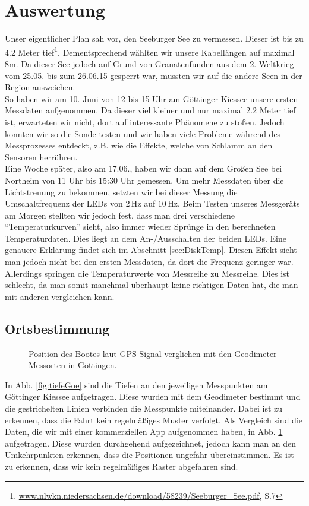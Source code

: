 \documentclass[12pt,a4paper,titlepage,headinclude,bibtotoc]{scrartcl}
\numberwithin{equation}{subsection}
\begin{document}
\section{Auswertung}
\label{sec:auswertung}

Unser eigentlicher Plan sah vor, den Seeburger See zu vermessen.
Dieser ist bis zu 4.2 Meter tief\footnote{\url{www.nlwkn.niedersachsen.de/download/58239/Seeburger\_See.pdf}, S.7}.
Dementsprechend wählten wir unsere Kabellängen auf maximal 8\si{\meter}.
Da dieser See jedoch auf Grund von Granatenfunden aus dem 2. Weltkrieg vom 25.05. bis zum 26.06.15 gesperrt war, mussten wir auf die andere Seen in der Region ausweichen.\\
So haben wir am 10. Juni von 12 bis 15 Uhr am Göttinger Kiessee unsere ersten Messdaten aufgenommen.
Da dieser viel kleiner und nur maximal 2.2 Meter tief ist, erwarteten wir nicht, dort auf interessante Phänomene zu stoßen.
Jedoch konnten wir so die Sonde testen und wir haben viele Probleme während des Messprozesses entdeckt, z.B. wie die Effekte, welche von Schlamm an den Sensoren herrühren.\\
Eine Woche später, also am 17.06., haben wir dann auf dem Großen See bei Northeim von 11 Uhr bis 15:30 Uhr gemessen.
Um mehr Messdaten über die Lichtstreuung zu bekommen, setzten wir bei dieser Messung die Umschaltfrequenz der LEDs von $2\,$Hz auf $10\,$Hz.
Beim Testen unseres Messgeräts am Morgen stellten wir jedoch fest, dass man drei verschiedene "`Temperaturkurven"' sieht, also immer wieder Sprünge in den berechneten Temperaturdaten.
Dies liegt an dem An-/Ausschalten der beiden LEDs.
Eine genauere Erklärung findet sich im Abschnitt \ref{sec:DiskTemp}.
Diesen Effekt sieht man jedoch nicht bei  den ersten Messdaten, da dort die Frequenz geringer war.
Allerdings springen die Temperaturwerte von Messreihe zu Messreihe.
Dies ist schlecht, da man somit manchmal überhaupt keine richtigen Daten hat, die man mit anderen vergleichen kann.

\subsection{Ortsbestimmung}
\label{sec:ausort}
\begin{figure}[!h]
\centering

\caption{Position des Bootes laut GPS-Signal verglichen mit den Geodimeter Messorten in Göttingen.}
\label{fig:GPSGoe}
\end{figure}

In Abb. \ref{fig:tiefeGoe} sind die Tiefen an den jeweiligen Messpunkten am Göttinger Kiessee aufgetragen.
Diese wurden mit dem Geodimeter bestimmt und die gestrichelten Linien verbinden die Messpunkte miteinander.
Dabei ist zu erkennen, dass die Fahrt kein regelmäßiges Muster verfolgt.
Als Vergleich sind die Daten, die wir mit einer kommerziellen App aufgenommen haben, in Abb. \ref{fig:GPSGoe} aufgetragen.
Diese wurden durchgehend aufgezeichnet, jedoch kann man an den Umkehrpunkten erkennen, dass die Positionen ungefähr übereinstimmen.
Es ist zu erkennen, dass wir kein regelmäßiges Raster abgefahren sind.
\end{document}
